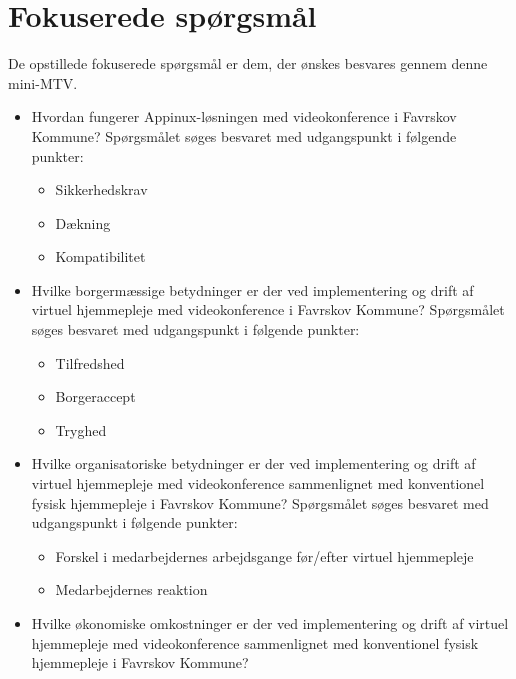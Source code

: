\section{Fokuserede spørgsmål}
De opstillede fokuserede spørgsmål er dem, der ønskes besvares gennem denne mini-MTV. 

\begin{itemize}
	\item Hvordan fungerer Appinux-løsningen med videokonference i Favrskov Kommune? Spørgsmålet søges besvaret med udgangspunkt i følgende punkter:
	\begin{itemize}
	\item Sikkerhedskrav
	\item Dækning %
	\item Kompatibilitet 
\end{itemize}
\end{itemize}

\begin{itemize}
	\item Hvilke borgermæssige betydninger er der ved implementering og drift af virtuel hjemmepleje med videokonference i Favrskov Kommune? Spørgsmålet søges besvaret med udgangspunkt i følgende punkter:
	\begin{itemize}
	\item Tilfredshed
	\item Borgeraccept
	\item Tryghed
\end{itemize}
\end{itemize}

\begin{itemize}
	\item Hvilke organisatoriske betydninger er der ved implementering og drift af virtuel hjemmepleje med videokonference sammenlignet med konventionel fysisk hjemmepleje i Favrskov Kommune? Spørgsmålet søges besvaret med udgangspunkt i følgende punkter:
	\begin{itemize}
	\item Forskel i medarbejdernes arbejdsgange før/efter virtuel hjemmepleje
	\item Medarbejdernes reaktion
\end{itemize}
\end{itemize}


\begin{itemize}
	\item Hvilke økonomiske omkostninger er der ved implementering og drift af virtuel hjemmepleje med videokonference sammenlignet med konventionel fysisk hjemmepleje i Favrskov Kommune?
\end{itemize}

